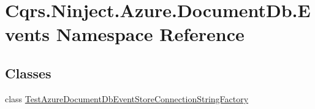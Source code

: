 \hypertarget{namespaceCqrs_1_1Ninject_1_1Azure_1_1DocumentDb_1_1Events}{}\section{Cqrs.\+Ninject.\+Azure.\+Document\+Db.\+Events Namespace Reference}
\label{namespaceCqrs_1_1Ninject_1_1Azure_1_1DocumentDb_1_1Events}
\subsection*{Classes}
\begin{DoxyCompactItemize}
\item 
class \hyperlink{classCqrs_1_1Ninject_1_1Azure_1_1DocumentDb_1_1Events_1_1TestAzureDocumentDbEventStoreConnectionStringFactory}{Test\+Azure\+Document\+Db\+Event\+Store\+Connection\+String\+Factory}
\end{DoxyCompactItemize}
